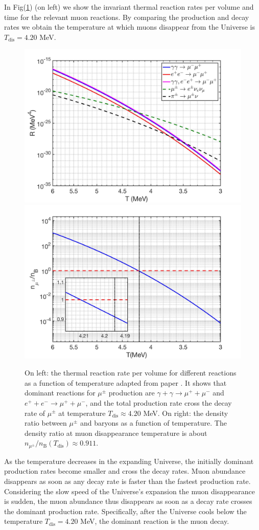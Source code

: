 \documentclass[universe,article,submit,moreauthors,pdftex,a4paper]{Definitions/mdpi}
\begin{document}
In Fig(\ref{muon_fig}) (on left) we show the invariant thermal reaction rates per volume and time for the relevant muon reactions. By comparing the production and decay rates we obtain the temperature at which muons disappear from the Universe is $T_\mathrm{dis} = 4.20$ MeV. 
\begin{figure}[t]
\centering
\includegraphics[width=0.49\columnwidth]{MuonRate_new2.pdf}
\includegraphics[width=0.49\columnwidth]{MuonDensityRatio_new2 .pdf}
\caption{On left: the thermal reaction rate per volume for different reactions as a function of temperature adapted from paper \cite{Rafelski:2021aey}. It shows that dominant reactions for $\mu^\pm$ production are ${\gamma+\gamma\to\mu^++\mu^-}$ and $e^++e^-\to\mu^++\mu^-$, and the total production rate cross the decay rate of $\mu^\pm$ at temperature $T_\mathrm{dis}\approx 4.20$ MeV. On right: the density ratio between $\mu^\pm$ and baryons as a function of temperature. The density ratio at muon disappearance temperature is about $n_{\mu^\pm}/n_\mathrm{B}(T_\mathrm{dis})\approx0.911$.}
\label{muon_fig} 
\end{figure}
As the temperature decreases in the expanding Universe, the initially dominant production rates become smaller and cross the decay rates. Muon abundance disappears as soon as any decay rate is faster than the fastest production rate. Considering the slow speed of the Universe's expansion the muon disappearance is sudden, the muon abundance thus disappears as soon as a decay rate crosses the dominant production rate. Specifically, after the Universe cools below the temperature $T_\mathrm{dis} = 4.20$ MeV, the dominant reaction is the muon decay.
\end{document}
